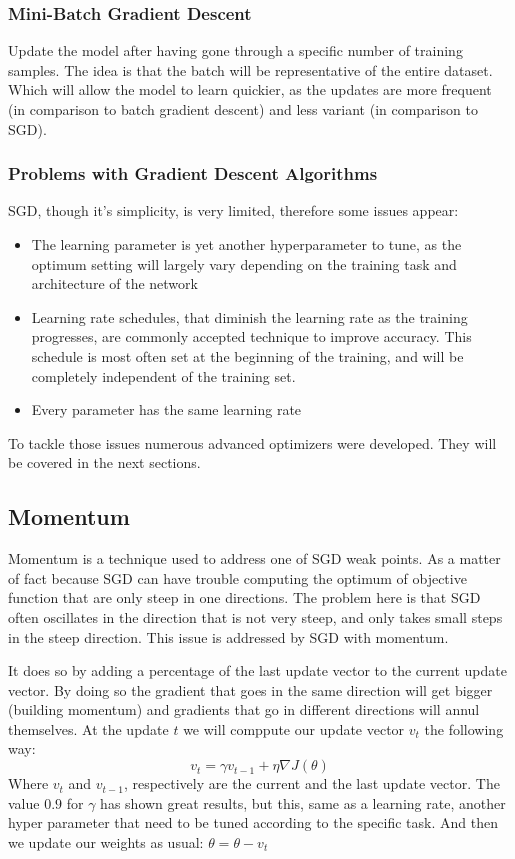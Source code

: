 \subsubsection{Mini-Batch Gradient Descent} 
Update the model after having gone through a specific number of training samples. The idea is that the batch will be representative of the entire dataset. Which will allow the model to learn quickier, as the updates are more frequent (in comparison to batch gradient descent) and less variant (in comparison to SGD).

\subsubsection{Problems with Gradient Descent Algorithms}
SGD, though it's simplicity, is very limited, therefore some issues appear:

\begin{itemize}
\item The learning parameter is yet another hyperparameter to tune, as the optimum setting will largely vary depending on the training task and architecture of the network
\item Learning rate schedules, that diminish the learning rate as the training progresses, are commonly accepted technique to improve accuracy. This schedule is most often set at the beginning of the training, and will be completely independent of the training set. 
\item Every parameter has the same learning rate
\end{itemize}
To tackle those issues numerous advanced optimizers were developed. They will be covered in the next sections. 

\subsection{Momentum}
Momentum is a technique used to address one of SGD weak points. As a matter of fact because SGD can have trouble computing the optimum of objective function that are only steep in one directions. The problem here is that SGD often oscillates in the direction that is not very steep, and only takes small steps in the steep direction. This issue is addressed by SGD with momentum. 

It does so by adding a percentage of the last update vector to the current update vector. By doing so the gradient that goes in the same direction will get bigger (building momentum) and gradients that go in different directions will annul themselves. 
 At the update $t$ we will comppute our update vector $v_t$ the following way:
\begin{equation}
v_t = \gamma v_{t-1} + \eta \nabla J (\theta)
\end{equation}\label{eq:momentum}
Where $v_t$ and $v_{t-1}$, respectively are the current and the last update vector. The value $0.9$ for $\gamma$ has shown great results, but this, same as a learning rate, another hyper parameter that need to be tuned according to the specific task. 
And then we update our weights as usual: $\theta = \theta - v_t$ 
